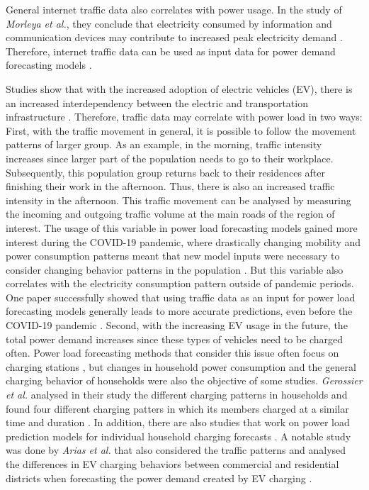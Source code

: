 General internet traffic data also correlates with power usage.
In the study of \textit{Morleya et al.}, they conclude that 
electricity consumed by information and communication devices
may contribute to increased peak electricity demand 
\cite{internettrafficenergycorrelation}.
Therefore, internet traffic data can be used as input data for 
power demand forecasting models \cite{electricityinternetforecast}. 

Studies show that with the increased adoption of electric vehicles (EV), 
there is an increased interdependency between the electric and 
transportation infrastructure \cite{interdependnytrafficenergy}. 
Therefore, traffic data may correlate with power load 
in two ways:
First, with the traffic movement in general, it is possible to follow the
movement patterns of larger group. As an example, in the morning,
traffic intensity increases since larger part of the population needs
to go to their workplace. Subsequently, this population group
returns back to their residences after finishing their work in the afternoon.
Thus, there is also an increased traffic intensity in the afternoon.
This traffic movement can be analysed by measuring the 
incoming and outgoing traffic volume at the main roads of the 
region of interest. The usage of this variable in power load
forecasting models gained more interest during the COVID-19 pandemic, 
where drastically changing mobility and power consumption 
patterns meant that new model inputs were necessary to consider changing
behavior patterns in the population 
\cite{covidtrafficpower} \cite{covidtrafficpower2}.
But this variable also correlates with the electricity consumption pattern
outside of pandemic periods. One paper successfully showed that
using traffic data as an input for power load
forecasting models generally leads to more accurate predictions, even before
the COVID-19 pandemic \cite{causalmodeltrafficelectricity}.
Second, with the increasing EV usage in the future, 
the total power demand increases since these types of vehicles 
need to be charged often. Power load forecasting methods that consider this
issue often focus on charging stations \cite{evcharchingstations}
\cite{evcharchingstations2}, but changes in household power consumption 
and the general charging behavior of households
were also the objective of some studies. \textit{Gerossier et al.}
analysed in their study the different charging patterns in households
and found four different charging patters in which its members charged at 
a similar time and duration \cite{gerossier2019modeling}.
In addition, there are also studies that work on
power load prediction models for individual household
charging forecasts \cite{skala2023interval}. 
A notable study was done by \textit{Arias et al.} that also considered the traffic patterns
and analysed the differences in EV charging behaviors between
commercial and residential districts when forecasting the power demand
created by EV charging \cite{arias2016electric}.

